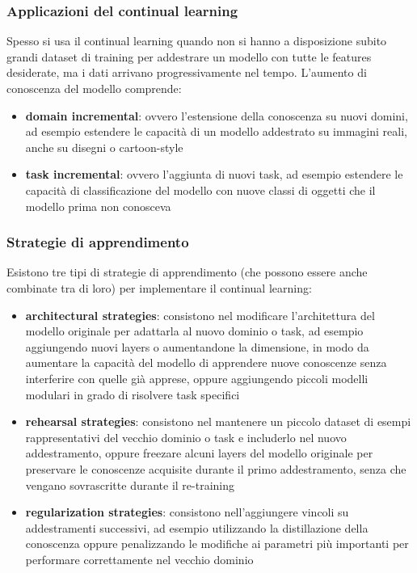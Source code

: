 \subsubsection*{Applicazioni del continual learning}
Spesso si usa il continual learning quando non si hanno a disposizione subito grandi dataset di training per addestrare un
modello con tutte le features desiderate, ma i dati arrivano progressivamente nel tempo. L'aumento di conoscenza del modello
comprende:
\begin{itemize}
	\item \textbf{domain incremental}: ovvero l'estensione della conoscenza su nuovi domini, ad esempio estendere le capacità
	di un modello addestrato su immagini reali, anche su disegni o cartoon-style
	\item \textbf{task incremental}: ovvero l'aggiunta di nuovi task, ad esempio estendere le capacità di classificazione
	del modello con nuove classi di oggetti che il modello prima non conosceva
\end{itemize}

\subsubsection*{Strategie di apprendimento}
Esistono tre tipi di strategie di apprendimento (che possono essere anche combinate tra di loro) per implementare il
continual learning:
\begin{itemize}
	\item \textbf{architectural strategies}: consistono nel modificare l'architettura del modello originale per adattarla
	al nuovo dominio o task, ad esempio aggiungendo nuovi layers o aumentandone la dimensione, in modo da aumentare la
	capacità del modello di apprendere nuove conoscenze senza interferire con quelle già apprese, oppure aggiungendo piccoli
	modelli modulari in grado di risolvere task specifici
	\item \textbf{rehearsal strategies}: consistono nel mantenere un piccolo dataset di esempi rappresentativi del vecchio
	dominio o task e includerlo nel nuovo addestramento, oppure freezare alcuni layers del modello originale per preservare
	le conoscenze acquisite durante il primo addestramento, senza che vengano sovrascritte durante il re-training
	\item \textbf{regularization strategies}: consistono nell'aggiungere vincoli su addestramenti successivi, ad esempio
	utilizzando la distillazione della conoscenza oppure penalizzando le modifiche ai parametri più importanti per
	performare correttamente nel vecchio dominio
\end{itemize}

